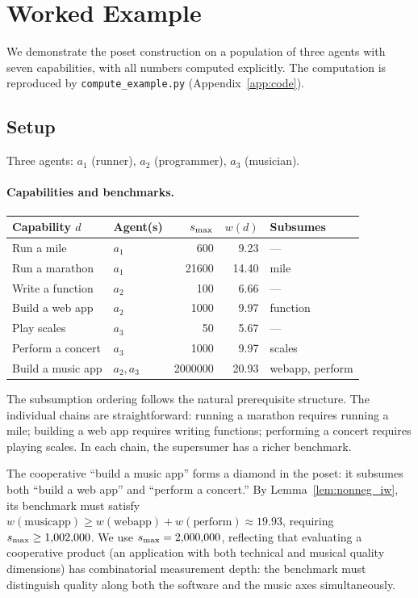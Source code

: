 \section{Worked Example}
\label{sec:example}

We demonstrate the poset construction on a population of three agents with
seven capabilities, with all numbers computed explicitly. The computation is
reproduced by \texttt{compute\_example.py} (Appendix~\ref{app:code}).

\subsection{Setup}

Three agents: $a_1$ (runner), $a_2$ (programmer), $a_3$ (musician).

\paragraph{Capabilities and benchmarks.}

\begin{center}
\begin{tabular}{@{}llrrl@{}}
\toprule
\textbf{Capability $d$} & \textbf{Agent(s)} & $s_{\mathrm{max}}$ & $w(d)$ & \textbf{Subsumes} \\
\midrule
Run a mile        & $a_1$         & 600       & 9.23  & --- \\
Run a marathon    & $a_1$         & 21600     & 14.40 & mile \\
Write a function  & $a_2$         & 100       & 6.66  & --- \\
Build a web app   & $a_2$         & 1000      & 9.97  & function \\
Play scales       & $a_3$         & 50        & 5.67  & --- \\
Perform a concert & $a_3$         & 1000      & 9.97  & scales \\
Build a music app & $a_2, a_3$    & 2000000   & 20.93 & webapp, perform \\
\bottomrule
\end{tabular}
\end{center}

The subsumption ordering follows the natural prerequisite structure. The
individual chains are straightforward: running a marathon requires running a
mile; building a web app requires writing functions; performing a concert
requires playing scales. In each chain, the supersumer has a richer benchmark.

The cooperative ``build a music app'' forms a diamond in the poset: it
subsumes both ``build a web app'' and ``perform a concert.'' By
Lemma~\ref{lem:nonneg_iw}, its benchmark must satisfy $w(\text{musicapp}) \geq
w(\text{webapp}) + w(\text{perform}) \approx 19.93$, requiring $s_{\mathrm{max}} \geq
1{,}002{,}000$. We use $s_{\mathrm{max}} = 2{,}000{,}000$, reflecting that evaluating a
cooperative product (an application with both technical and musical quality
dimensions) has combinatorial measurement depth: the benchmark must
distinguish quality along both the software and the music axes simultaneously.

